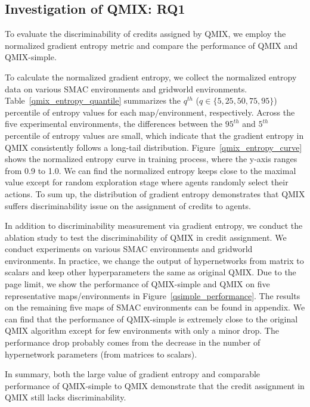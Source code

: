 \subsection{Investigation of QMIX: RQ1}

To evaluate the discriminability of credits assigned by QMIX, we employ the normalized gradient entropy metric and compare the performance of QMIX and QMIX-simple.

To calculate the normalized gradient entropy, we collect the normalized entropy data on various SMAC environments and gridworld environments.
Table~\ref{qmix_entropy_quantile} summarizes the $q^{th}$ ($q \in \{5,25,50,75,95\}$) percentile of entropy values for each map/environment, respectively.
Across the five experimental environments, the differences between the $95^{th}$ and $5^{th}$ percentile of entropy values are small, which indicate that the gradient entropy in QMIX consistently follows a long-tail distribution.
Figure~\ref{qmix_entropy_curve} shows the normalized entropy curve in training process, where the y-axis ranges from 0.9 to 1.0.
We can find the normalized entropy keeps close to the maximal value except for random exploration stage where agents randomly select their actions.
To sum up, the distribution of gradient entropy demonstrates that QMIX suffers discriminability issue on the assignment of credits to agents.

In addition to discriminability measurement via gradient entropy, we conduct the ablation study to test the discriminability of QMIX in credit assignment.
We conduct experiments on various SMAC environments and gridworld environments.
In practice, we change the output of hypernetworks from matrix to scalars and keep other hyperparameters the same as original QMIX.
Due to the page limit, we show the performance of QMIX-simple and QMIX on five representative maps/environments in Figure~\ref{qsimple_performance}.
The results on the remaining five maps of SMAC environments can be found in appendix.
We can find that the performance of QMIX-simple is extremely close to the original QMIX algorithm except for few environments with only a minor drop.
The performance drop probably comes from the decrease in the number of hypernetwork parameters (from matrices to scalars).

In summary, both the large value of gradient entropy and comparable performance of QMIX-simple to QMIX demonstrate that the credit assignment in QMIX still lacks discriminability. 

